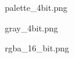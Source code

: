{\XeTeXpicfile palette_4bit.png }

{\XeTeXpicfile gray_4bit.png }

{\XeTeXpicfile rgba_16_bit.png }

\bye
